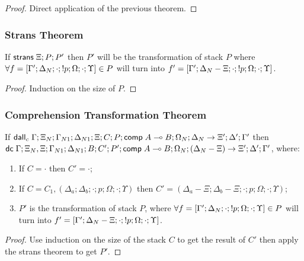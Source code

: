 \begin{proof}
   Direct application of the previous theorem.
\end{proof}

\subsubsection{Strans Theorem}

\begin{theorem}
   If $\mathsf{strans} \; \Xi; P; P'$ then $P'$ will be the transformation of stack $P$ where $\forall f = [\Gamma'; \Delta_N; \cdot; {!} p; \Omega; \cdot; \Upsilon] \in P$ will turn into $f' = [\Gamma'; \Delta_N - \Xi; \cdot; {!} p; \Omega; \cdot; \Upsilon]$.
\end{theorem}

\begin{proof}
   Induction on the size of $P$.
\end{proof}

\subsubsection{Comprehension Transformation Theorem}

\begin{theorem}
   If $\mathsf{dall}_c \; \Gamma; \Xi_N; \Gamma_{N1}; \Delta_{N1}; \Xi; C; P; \mathsf{comp} \; A \multimap B; \Omega_N; \Delta_N \rightarrow \Xi'; \Delta'; \Gamma'$ then \\
      $\mathsf{dc} \; \Gamma; \Xi_N, \Xi; \Gamma_{N1}; \Delta_{N1}; B; C' ; P'; \mathsf{comp} \; A \multimap B; \Omega_N; (\Delta_N - \Xi) \rightarrow \Xi'; \Delta'; \Gamma'$, where:
   
   \begin{enumerate}
      \item If $C = \cdot$ then $C' = \cdot$;
      \item If $C = C_1, (\Delta_a; \Delta_b; \cdot; p; \Omega; \cdot; \Upsilon)$ then $C' = (\Delta_a - \Xi; \Delta_b - \Xi; \cdot; p; \Omega; \cdot; \Upsilon)$;
      \item $P'$ is the transformation of stack $P$, where $\forall f = [\Gamma'; \Delta_N; \cdot; {!} p; \Omega; \cdot; \Upsilon] \in P$ will turn into $f' = [\Gamma'; \Delta_N - \Xi; \cdot; {!} p; \Omega; \cdot; \Upsilon]$.
   \end{enumerate}
\end{theorem}

\begin{proof}
   Use induction on the size of the stack $C$ to get the result of $C'$ then apply the strans theorem to get $P'$.
\end{proof}

